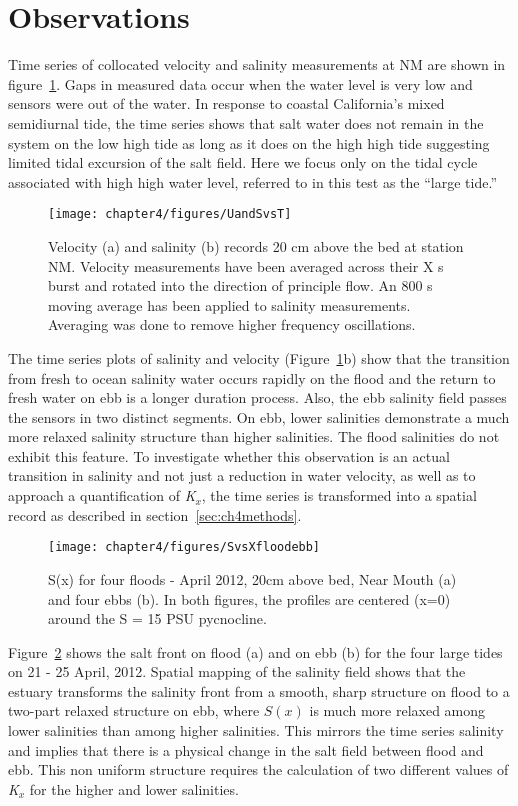\section{Observations} \label{sec:ObsCh4}
Time series of collocated velocity and salinity measurements at NM are shown in figure~\ref{fig:UandSvsTch4}. Gaps in measured data occur when the water level is very low and sensors were out of the water. In response to coastal California's mixed semidiurnal tide, the time series shows that salt water does not remain in the system on the low high tide  as long as it does on the high high tide suggesting limited tidal excursion of the salt field. Here we focus only on the tidal cycle associated with high high water level, referred to in this test as the \textquotedblleft large tide.''

\begin{figure}[h]
	\texttt{[image: chapter4/figures/UandSvsT]} 
\caption{Velocity (a) and salinity (b) records 20 cm above the bed at station NM. Velocity measurements have been averaged across their X s burst and rotated into the direction of principle flow. An 800 s moving average has been applied to salinity measurements. Averaging was done to remove higher frequency oscillations.} \label{fig:UandSvsTch4}
\end{figure}

The time series plots of salinity and velocity (Figure~\ref{fig:UandSvsTch4}b) show that the transition from fresh to ocean salinity water occurs rapidly on the flood and the return to fresh water on ebb is a longer duration process. Also, the ebb salinity field passes the sensors in two distinct segments. On ebb, lower salinities demonstrate a much more relaxed salinity structure than higher salinities. The flood salinities do not exhibit this feature. To investigate whether this observation is an actual transition in salinity and not just a reduction in water velocity, as well as to approach a quantification of \emph{K$_x$}, the time series is transformed into a spatial record as described in section~\ref{sec:ch4methods}. 

\begin{figure}[hp]
	\texttt{[image: chapter4/figures/SvsXfloodebb]} 
\caption{S(x) for four floods - April 2012, 20cm above bed, Near Mouth (a) and four ebbs (b). In both figures, the profiles are centered (x=0) around the S = 15 PSU pycnocline.} \label{fig:SvsXall}
\end{figure}

Figure~\ref{fig:SvsXall} shows the salt front on flood (a) and on ebb (b) for the four large tides on 21 - 25 April, 2012. Spatial mapping of the salinity field shows that the estuary transforms  the salinity front from a smooth, sharp structure on flood to a two-part relaxed structure on ebb, where $S(x)$ is much more relaxed among lower salinities than among higher salinities. This mirrors the time series salinity and implies that there is a physical change in the salt field between flood and ebb. This non uniform structure requires the calculation of two different values of \emph{K$_x$} for the higher and lower salinities.

